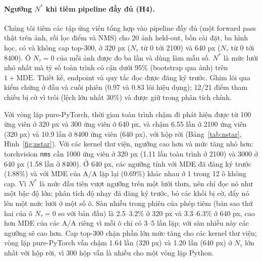 \documentclass[a4paper,fleqn]{cas-dc}
\newcommand{\Ntau}{N_{\tau}}
\begin{document}
\paragraph{Ngưỡng $N^{*}$ khi tiêm pipeline đầy đủ (H4).}
Chúng tôi tiêm các tập ứng viên tổng hợp vào pipeline đầy đủ (một forward pass thật trên ảnh, rồi lọc điểm và NMS) cho 20 ảnh held-out, bốn cài đặt, ba hình học, có và không cap top-300, ở 320 px ($\Ntau$ từ 0 tới 2100) và 640 px ($\Ntau$ từ 0 tới 8400). Ô $\Ntau=0$ của mỗi ảnh được đo ba lần và dùng làm mẫu số. $N^{*}$ là mức lưới nhỏ nhất mà tỷ số toàn trình có cận dưới 95\% (bootstrap qua ảnh) trên $1+\mathrm{MDE}$. Thiết kế, endpoint và quy tắc đọc được đăng ký trước. Ghim lõi qua kiểm chứng ở đầu và cuối phiên (0.97 và 0.83 lõi hiệu dụng); 12/21 điểm tham chiếu bị cờ vì trôi (lệch lớn nhất 30\%) và được giữ trong phân tích chính.

Với vòng lặp pure-PyTorch, thời gian toàn trình chậm đi phát hiện được từ 100 ứng viên ở 320 px và 300 ứng viên ở 640 px, và chậm 6.55 lần ở 2100 ứng viên (320 px) và 10.9 lần ở 8400 ứng viên (640 px), với hộp rời (Bảng~\ref{tab:nstar}, Hình~\ref{fig:nstar}). Với các kernel thư viện, ngưỡng cao hơn và mức tăng nhỏ hơn: torchvision \texttt{nms} cần 1000 ứng viên ở 320 px (1.11 lần toàn trình ở 2100) và 3000 ở 640 px (1.58 lần ở 8400). Ở 640 px, các ngưỡng tính với MDE đã đăng ký trước (1.88\%) và với MDE của A/A lặp lại (0.69\%) khác nhau ở 1 trong 12 ô không cap. Vì $N^{*}$ là mức đầu tiên vượt ngưỡng trên một lưới thưa, nên chỉ đọc nó như một bậc độ lớn; phân tích độ nhạy đã đăng ký trước, bỏ các khối bị cờ, đẩy nó lên một mức lưới ở một số ô. Sàn nhiễu trong phiên của phép tiêm (bản sao thứ hai của ô $\Ntau=0$ so với bản đầu) là 2.5--3.2\% ở 320 px và 3.3--6.3\% ở 640 px, cao hơn MDE của các A/A riêng vì mỗi ô chỉ có 3--5 lần lặp; với sàn nhiễu này các ngưỡng sẽ cao hơn. Cap top-300 chặn phần lớn mức tăng cho các kernel thư viện; vòng lặp pure-PyTorch vẫn chậm 1.64 lần (320 px) và 1.20 lần (640 px) ở $\Ntau$ lớn nhất với hộp rời, vì 300 hộp vẫn là nhiều cho một vòng lặp Python.
\end{document}
